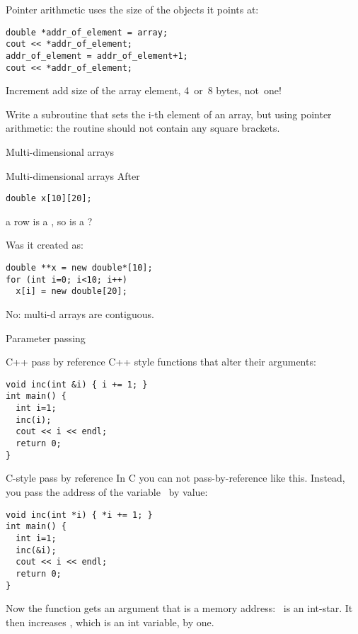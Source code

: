 \begin{block}{Pointer arithmetic}
   uses the size of the objects it
  points at:
\begin{verbatim}
double *addr_of_element = array;
cout << *addr_of_element;
addr_of_element = addr_of_element+1;
cout << *addr_of_element;
\end{verbatim}
Increment add size of the array element, 4~or~8 bytes, not~one!
\end{block}

\begin{exercise}
  Write a subroutine that sets the i-th element of an array, but using
  pointer arithmetic: the routine should not contain any square brackets.
\end{exercise}

 {Multi-dimensional arrays}

\begin{block}{Multi-dimensional arrays}
  \label{sl:static-multi}
After
\begin{verbatim}
double x[10][20];
\end{verbatim}
a row  is a , so is  a ?

Was it created as:
\begin{verbatim}
double **x = new double*[10];
for (int i=0; i<10; i++)
  x[i] = new double[20];
\end{verbatim}
No: multi-d arrays are contiguous.
\end{block}

 {Parameter passing}

\begin{block}{C++ pass by reference}
  \label{sl:cpp-pass-ref}
  C++ style functions that alter their arguments:
\begin{verbatim}
void inc(int &i) { i += 1; }
int main() {
  int i=1;
  inc(i);
  cout << i << endl;
  return 0;
}
\end{verbatim}
\end{block}

\begin{block}{C-style pass by reference}
  \label{sl:c-pass-ref}
  In C you can not pass-by-reference like this. Instead, you pass the
  address of the variable~ by value:
\begin{verbatim}
void inc(int *i) { *i += 1; }
int main() {
  int i=1;
  inc(&i);
  cout << i << endl;
  return 0;
}
\end{verbatim}
Now the function gets an argument that is a memory address: ~is
an int-star. It then increases , which is an int variable, by one.
\end{block}

